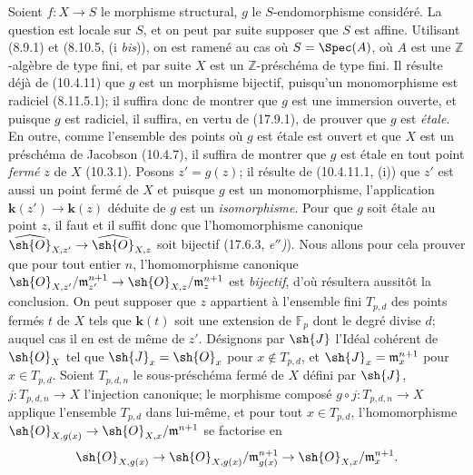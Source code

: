 Soient $f:X\to S$ le morphisme structural, $g$ le $S$-endomorphisme considéré. La question est locale sur $S$, et on peut par suite supposer que $S$ est affine. Utilisant (8.9.1) et (8.10.5, (i \emph{bis})), on est ramené au cas où $S=\Spec(A)$, où $A$ est une $\mathbb{Z}$-algèbre de type fini, et par suite $X$ est un $\mathbb{Z}$-préschéma de type fini. Il résulte déjà de (10.4.11) que $g$ est un morphisme bijectif, puisqu'un monomorphisme est radiciel (8.11.5.1); il suffira donc de montrer
que $g$ est une immersion ouverte, et puisque $g$ est radiciel, il suffira, en vertu de (17.9.1), de prouver que $g$ est \emph{étale}. En outre, comme l'ensemble des points où $g$ est étale est ouvert et que $X$ est un préschéma de Jacobson (10.4.7), il suffira de montrer que $g$ est étale en tout point \emph{fermé} $z$ de $X$ (10.3.1). Posons $z'=g(z)$; il résulte de (10.4.11.1, (i)) que $z'$ est aussi un point fermé de $X$ et puisque $g$ est un monomorphisme, l'application $\boldsymbol{k}(z')\to\boldsymbol{k}(z)$ déduite de $g$ est un \emph{isomorphisme}. Pour que $g$ soit étale au point $z$, il faut et il suffit donc que l'homomorphisme canonique $\widehat{\sh{O}}_{X,z'}\to\widehat{\sh{O}}_{X,z}$ soit bijectif (17.6.3, \emph{e$''$)}). Nous allons pour cela prouver que pour tout entier $n$, l'homomorphisme canonique $\sh{O}_{X,z'}/\mathfrak m_{z'}^{n+1}\to\sh{O}_{X,z}/\mathfrak m_z^{n+1}$ est \emph{bijectif}, d'où résultera aussitôt la conclusion. On peut supposer que $z$ appartient à l'ensemble fini $T_{p,d}$ des points fermés $t$ de $X$ tels que $\boldsymbol{k}(t)$ soit une extension de $\mathbb{F}_p$ dont le degré divise $d$; auquel cas il en est de même de $z'$. Désignons par $\sh{J}$ l'Idéal cohérent de $\sh{O}_X$ tel que $\sh{J}_x=\sh{O}_x$ pour $x\notin T_{p,d}$, et $\sh{J}_x=\mathfrak m_x^{n+1}$ pour $x\in T_{p,d}$. Soient $T_{p,d,n}$ le sous-préschéma fermé de $X$ défini par $\sh{J}$, $j:T_{p,d,n}\to X$ l'injection canonique; le morphisme composé $g\circ j:T_{p,d,n}\to X$ applique l'ensemble $T_{p,d}$ dans lui-même, et pour tout $x\in T_{p,d}$, l'homomorphisme $\sh{O}_{X,g(x)}\to\sh{O}_{X,x}/\mathfrak m^{n+1}$ se factorise en
\[
\sh{O}_{X,g(x)}\to\sh{O}_{X,g(x)}/\mathfrak m_{g(x)}^{n+1}\to\sh{O}_{X,x}/\mathfrak m_x^{n+1}.
\]
